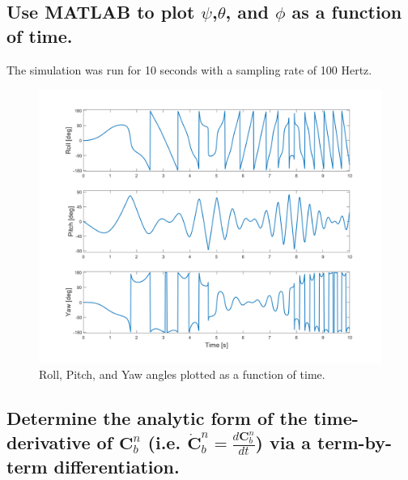 \documentclass[12pt,letterpaper, onecolumn]{exam}
\begin{document}
\begin{questions}
\begin{parts}
        \part{Use MATLAB to plot $\psi$,$\theta$, and $\phi$ as a function of time.}

        The simulation was run for 10 seconds with a sampling rate of 100 Hertz.

        \begin{figure}[!h]
            \centering
            \includegraphics[width=0.8\linewidth]{Euler_Angles.png}
            \caption{Roll, Pitch, and Yaw angles plotted as a function of time.}
            \label{fig:euler}
        \end{figure}

    \end{parts}
    \clearpage
    \begin{parts}
        \part{Determine the analytic form of the time-derivative of $\mathbf{C}^n_b$ (i.e. $\dot{\mathbf{C}}^n_b = \frac{d\mathbf{C}^n_b}{dt}$) via a term-by-term differentiation.}


\end{parts}
\end{questions}
\end{document}
